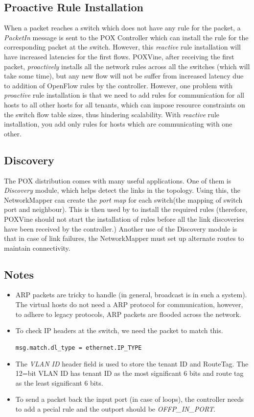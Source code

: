 \subsection{Proactive Rule Installation}
When a packet reaches a switch which does not have any rule for the packet, a \emph{PacketIn} message is sent to the POX Controller which can install the rule for the corresponding packet at the switch. However, this \emph{reactive} rule installation will have increased latencies for the first flows. POXVine, after receiving the first packet, \emph{proactively} installs all the network rules across all the switches (which will take some time), but any new flow will not be suffer from increased latency due to addition of OpenFlow rules by the controller. However, one problem with \emph{proactive} rule installation is that we need to add rules for communication for all hosts to all other hosts for all tenants, which can impose resource constraints on the switch flow table sizes, thus hindering scalability. With \emph{reactive} rule installation, you add only rules for hosts which are communicating with one other. 

\subsection{Discovery}
The POX distribution comes with many useful applications. One of them is \emph{Discovery} module, which helps detect the links in the topology. Using this, the NetworkMapper can create the \emph{port map} for each switch(the mapping of switch port and neighbour). This is then used by to install the required rules (therefore, POXVine should not start the installation of rules before all the link discoveries have been received by the controller.) Another use of the Discovery module is that in case of link failures, the NetworkMapper must set up alternate routes to maintain connectivity. 

\subsection{Notes}
\begin{itemize}
	\item ARP packets are tricky to handle (in general, broadcast is in such a system). The virtual hosts do not need a ARP protocol for communication, however, to adhere to legacy protocols, ARP packets are flooded across the network. 
	\item To check IP headers at the switch, we need the packet to match this.
	\begin{center}
						\verb|msg.match.dl_type = ethernet.IP_TYPE|
	\end{center}
	\item The \emph{VLAN ID} header field is used to store the tenant ID and RouteTag. The 12=bit VLAN ID has tenant ID as the most significant 6 bits and route tag as the least significant 6 bits.
	\item To send a packet back the input port (in case of loops), the controller needs to add a pecial rule and the outport should be \emph{OFFP\_IN\_PORT}.
\end{itemize}

